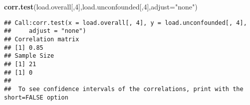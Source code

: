 \documentclass[
]{article}
\newenvironment{Shaded}{\begin{snugshade}}{\end{snugshade}}
\newcommand{\DataTypeTok}[1]{\textcolor[rgb]{0.13,0.29,0.53}{#1}}
\newcommand{\DecValTok}[1]{\textcolor[rgb]{0.00,0.00,0.81}{#1}}
\newcommand{\KeywordTok}[1]{\textcolor[rgb]{0.13,0.29,0.53}{\textbf{#1}}}
\newcommand{\NormalTok}[1]{#1}
\newcommand{\OperatorTok}[1]{\textcolor[rgb]{0.81,0.36,0.00}{\textbf{#1}}}
\newcommand{\StringTok}[1]{\textcolor[rgb]{0.31,0.60,0.02}{#1}}
\begin{document}
\begin{Shaded}
\begin{Highlighting}[]
\KeywordTok{corr.test}\NormalTok{(load.overall[,}\DecValTok{4}\NormalTok{],load.unconfounded[,}\DecValTok{4}\NormalTok{],}\DataTypeTok{adjust=}\StringTok{"none"}\NormalTok{)}
\end{Highlighting}
\end{Shaded}

\begin{verbatim}
## Call:corr.test(x = load.overall[, 4], y = load.unconfounded[, 4], 
##     adjust = "none")
## Correlation matrix 
## [1] 0.85
## Sample Size 
## [1] 21
## [1] 0
## 
##  To see confidence intervals of the correlations, print with the short=FALSE option
\end{verbatim}

\begin{Shaded}
\end{Shaded}
\end{document}
